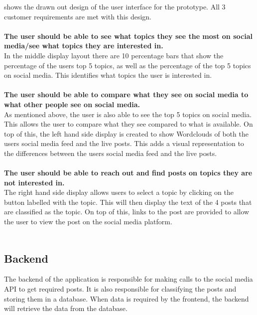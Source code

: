 \newpage
{} shows the drawn out design of the user interface for the prototype. All 3 customer requirements are met
with this design.\\\\
\textbf{The user should be able to see what topics they see the most on social media/see what topics they are interested in.}\\
In the middle display layout there are 10 percentage bars that show the percentage of the users top 5 topics, as well as the percentage
of the top 5 topics on social media. This identifies what topics the user is interested in.\\\\
\textbf{The user should be able to compare what they see on social media to what other people see on social media.}\\
As mentioned above, the user is also able to see the top 5 topics on social media. This allows the user to compare what they see
compared to what is available. On top of this, the left hand side display is created to show Wordclouds of both the users social media feed
and the live posts. This adds a visual representation to the differences between the users social media feed and the live posts.\\\\
\textbf{The user should be able to reach out and find posts on topics they are not interested in.}\\
The right hand side display allows users to select a topic by clicking on the button labelled with the topic. This will then display the text
 of the 4 posts that are classified as the topic. On top of this, links to the post are provided to allow the user to view the post on the social
media platform.\\\\
\subsection{Backend}
The backend of the application is responsible for making calls to the social media API to get required posts. It is also responsible
for classifying the posts and storing them in a database. When data is required by the frontend, the backend will retrieve the data
from the database.\\
